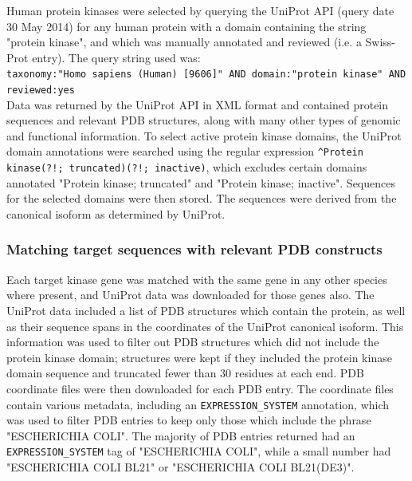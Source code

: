 \documentclass[9pt,lineno]{elife}
\begin{document}
Human protein kinases were selected by querying the UniProt API (query date 30 May 2014) for any human protein with a domain containing the string "protein kinase", and which was manually annotated and reviewed (i.e. a Swiss-Prot entry).
The query string used was:\\
{\tt taxonomy:"Homo sapiens (Human) [9606]" AND domain:"protein kinase" AND reviewed:yes}\\
Data was returned by the UniProt API in XML format and contained protein sequences and relevant PDB structures, along with many other types of genomic and functional information.
To select active protein kinase domains, the UniProt domain annotations were searched using the regular expression {\tt \^{}Protein kinase(?!; truncated)(?!; inactive)}, which excludes certain domains annotated "Protein kinase; truncated" and "Protein kinase; inactive".
Sequences for the selected domains were then stored.
The sequences were derived from the canonical isoform as determined by UniProt.

\subsubsection{Matching target sequences with relevant PDB constructs}

Each target kinase gene was matched with the same gene in any other species where present, and UniProt data was downloaded for those genes also.
The UniProt data included a list of PDB structures which contain the protein, as well as their sequence spans in the coordinates of the UniProt canonical isoform.
This information was used to filter out PDB structures which did not include the protein kinase domain; structures were kept if they included the protein kinase domain sequence and truncated fewer than 30 residues at each end.
PDB coordinate files were then downloaded for each PDB entry.
The coordinate files contain various metadata, including an {\tt EXPRESSION\_SYSTEM} annotation, which was used to filter PDB entries to keep only those which include the phrase "ESCHERICHIA COLI".
The majority of PDB entries returned had an {\tt EXPRESSION\_SYSTEM} tag of "ESCHERICHIA COLI", while a small number had "ESCHERICHIA COLI BL21" or "ESCHERICHIA COLI BL21(DE3)".
\end{document}

